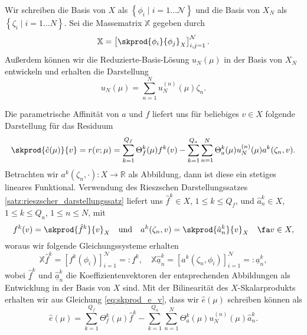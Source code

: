 Wir schreiben die Basis von $X$ als $\left\{ \phi_i \mid i = 1 \ldots \mathcal N \right\}$ und die Basis von $X_N$ als $\left\{ \zeta_i \mid i = 1 \ldots N \right\}$.
Sei die Massematrix $\mathbb{X}$ gegeben durch
\begin{equation}
    \mathbb{X} = \left[ \skprod{\phi_i}{\phi_j}_X \right]_{i,j=1}^{\mathcal N}.
\end{equation}
Außerdem können wir die Reduzierte-Basis-Lösung $u_N(\mu)$ in der Basis von $X_N$ entwickeln und erhalten die Darstellung
\begin{equation}
    u_N(\mu) = \sum_{n=1}^{N} u_N^{(n)}(\mu) \zeta_n.
\end{equation}

Die parametrische Affinität von $a$ und $f$ liefert uns für beliebiges $v \in X$ folgende Darstellung für das Residuum
\begin{equation}
    \label{eq:skprod_e_v}
    \skprod{\hat e(\mu)}{v} = r(v; \mu) = \sum_{k=1}^{Q_f} \Theta_f^k(\mu) f^k(v) - \sum_{k=1}^{Q_a} \sum_{n=1}^{N} \Theta_a^k(\mu) u_N^{(n)}(\mu)a^k(\zeta_n, v).
\end{equation}
Betrachten wir $a^k(\zeta_n, \cdot) \colon X \to \mathbb{R}$ als Abbildung, dann ist diese ein stetiges lineares Funktional. Verwendung des Rieszschen Darstellungssatzes \ref{satz:rieszscher_darstellungssatz} liefert uns $\hat f^k \in X$, $1 \leq k \leq Q_f$, und $\hat a^k_n \in X$, $1 \leq k \leq Q_a$, $1 \leq n \leq N$, mit
\begin{equation}
    f^k(v) = \skprod{\hat f^k}{v}_X \quad\text{und}\quad a^k(\zeta_n, v) = \skprod{\hat a^k_n}{v}_X \quad \fa v \in X,
\end{equation}
woraus wir folgende Gleichungssysteme erhalten
\begin{equation}
    \label{eq:Xf_eq_f_and_Xa_eq_a}
    \mathbb{X} \underline{\hat{f}}^k = [f^k(\phi_i)]_{i=1}^{\mathcal N} =: \underline f^k, \quad \mathbb{X} \underline{\hat{a}}^k_n = [a^k(\zeta_n, \phi_i)]_{i=1}^{\mathcal N} =: \underline a^k_n,
\end{equation}
wobei $\underline{\hat{f}}^k$ und $\underline{\hat{a}}^k_n$ die Koeffizientenvektoren der entsprechenden Abbildungen als Entwicklung in der Basis von $X$ sind.
Mit der Bilinearität des $X$-Skalarprodukts erhalten wir aus Gleichung \eqref{eq:skprod_e_v}, dass wir $\hat e(\mu)$ schreiben können als
\begin{equation}
    \hat e(\mu) = \sum_{k=1}^{Q_f} \Theta_f^k(\mu) \hat f^k - \sum_{k=1}^{Q_a} \sum_{n=1}^{N} \Theta_a^k(\mu) u_N^{(n)}(\mu) \hat a^k_n.
\end{equation}
